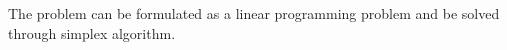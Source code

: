 \begin{exercise}[]
\begin{solution}



  


    The problem can be formulated as a linear programming problem and be solved through simplex algorithm.


\end{solution}
\end{exercise}
